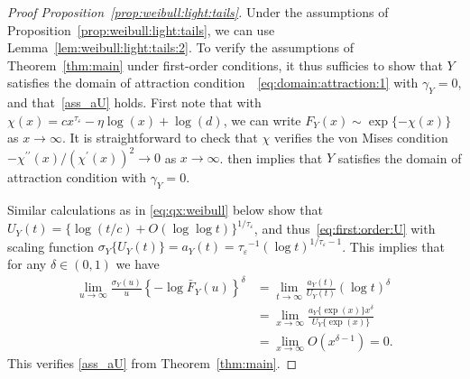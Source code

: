 \documentclass{statsoc}
\theoremstyle{break}
\newcommand{\eps}{\varepsilon}
\begin{document}
\begin{proof}[Proof Proposition~\ref{prop:weibull:light:tails}]
Under the assumptions of Proposition~\ref{prop:weibull:light:tails}, we can use Lemma~\ref{lem:weibull:light:tails:2}. To verify the assumptions of Theorem~\ref{thm:main} under first-order conditions, it thus sufficies to show that $Y$ satisfies the domain of attraction condition~~\eqref{eq:domain:attraction:1} with $\gamma_Y = 0$, and that~\eqref{ass_aU} holds.
First note that with $\chi(x) =  c x^{\tau_\eps} - \eta \log(x) + \log(d)$,
we can write $F_Y(x) \sim  \exp\{- \chi(x)\}$ as $x  \to \infty$. It is straightforward to check that $\chi$ verifies the von Mises condition $-{\chi^{\prime \prime} (x) }/{({\chi^\prime}(x))^2} \to 0$ as $x \to \infty$. \citet[][Example 3.3.24]{embrechts:kluppelberg:mikosch:2013} then implies that $Y$ satisfies the domain of attraction  condition with $\gamma_Y = 0$. 

Similar calculations as in \eqref{eq:qx:weibull} below show that $U_Y(t) = \{ \log(t/c) + O(\log \log t)\}^{1/{\tau_\eps}}$, and thus~\eqref{eq:first:order:U} with scaling function $ \sigma_Y\{U_Y(t)\} = a_Y(t) = {\tau_\eps}^{-1} (\log t)^{1/{\tau_\eps} -1}$. This implies that for any $\delta \in (0,1)$ we have
	 \begin{align*}
		\lim_{u \to \infty}	\frac{\sigma_Y(u) }{u}
		\left\{- \log \bar F_Y(u) \right\}^{\delta}  &= 		
		\lim_{t \to \infty}	\frac{a_Y(t)}{U_Y(t)}
		\left(\log t \right)^{\delta} \\
		&= 	\lim_{x \to \infty}	\frac{a_Y\{\exp(x)\}x^{\delta}}{U_Y\{\exp(x)\}}
		  \\
		 & = \lim_{x\to\infty} O( x^{\delta -1}) = 0.
	 \end{align*}
 	 This verifies \eqref{ass_aU} from Theorem~\ref{thm:main}.
\end{proof}
\end{document}

